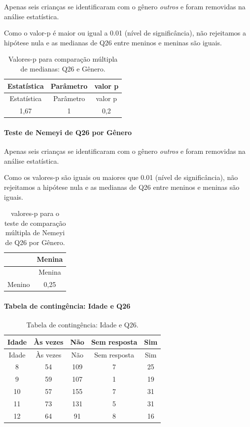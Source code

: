 \documentclass[]{article}
\let\oldparagraph\paragraph
\renewcommand{\paragraph}[1]{\oldparagraph{#1}\mbox{}}
\begin{document}
Apenas seis crianças se identificaram com o gênero \emph{outros} e foram removidas na análise estatística.

Como o valor-p é maior ou igual a 0.01 (nível de significância), não rejeitamos a hipótese nula e as medianas de Q26 entre meninos e meninas são iguais.

\begin{longtable}[]{@{}ccc@{}}
\caption{\label{tab:unnamed-chunk-738}Valores-p para comparação múltipla de medianas: Q26 e Gênero.}\tabularnewline
\toprule
Estatística & Parâmetro & valor p\tabularnewline
\midrule
\endfirsthead
\toprule
Estatística & Parâmetro & valor p\tabularnewline
\midrule
\endhead
1,67 & 1 & 0,2\tabularnewline
\bottomrule
\end{longtable}

\hypertarget{teste-de-nemeyi-de-q26-por-guxeanero}{%
\paragraph{Teste de Nemeyi de Q26 por Gênero}\label{teste-de-nemeyi-de-q26-por-guxeanero}}

Apenas seis crianças se identificaram com o gênero \emph{outros} e foram removidas na análise estatística.

Como os valores-p são iguais ou maiores que 0.01 (nível de significância), não rejeitamos a hipótese nula e as medianas de Q26 entre meninos e meninas são iguais.

\begin{longtable}[]{@{}lc@{}}
\caption{\label{tab:unnamed-chunk-740}valores-p para o teste de comparação múltipla de Nemeyi de Q26 por Gênero.}\tabularnewline
\toprule
& Menina\tabularnewline
\midrule
\endfirsthead
\toprule
& Menina\tabularnewline
\midrule
\endhead
Menino & 0,25\tabularnewline
\bottomrule
\end{longtable}

\cleardoublepage

\hypertarget{tabela-de-continguxeancia-idade-e-q26}{%
\paragraph{Tabela de contingência: Idade e Q26}\label{tabela-de-continguxeancia-idade-e-q26}}

\begin{longtable}[]{@{}ccccc@{}}
\caption{\label{tab:unnamed-chunk-741}Tabela de contingência: Idade e Q26.}\tabularnewline
\toprule
Idade & Às vezes & Não & Sem resposta & Sim\tabularnewline
\midrule
\endfirsthead
\toprule
Idade & Às vezes & Não & Sem resposta & Sim\tabularnewline
\midrule
\endhead
8 & 54 & 109 & 7 & 25\tabularnewline
9 & 59 & 107 & 1 & 19\tabularnewline
10 & 57 & 155 & 7 & 31\tabularnewline
11 & 73 & 131 & 5 & 31\tabularnewline
12 & 64 & 91 & 8 & 16\tabularnewline
\bottomrule
\end{longtable}
\end{document}
